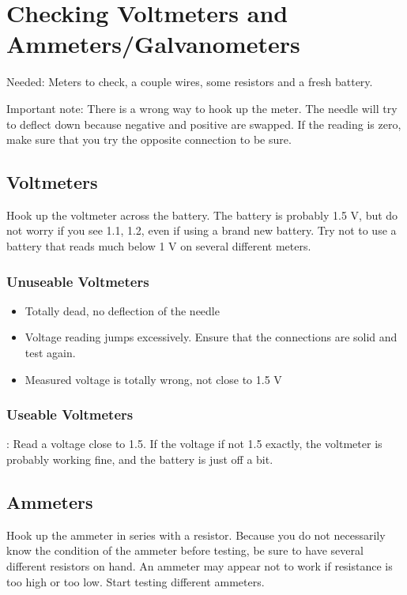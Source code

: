 \chapter{Checking Voltmeters and Ammeters/Galvanometers}
\label{cha:voltamm}
Needed: Meters to check, 
a couple wires, 
some resistors and a fresh battery.

Important note: There is a wrong way to hook up the meter. 
The needle will try to deflect down 
because negative and positive are swapped. 
If the reading is zero, 
make sure that you try the opposite connection to be sure.

\section{Voltmeters}
Hook up the voltmeter across the battery. 
The battery is probably 1.5 V, 
but do not worry if you see 1.1, 
1.2, 
even if using a brand new battery. 
Try not to use a battery that reads much below 1 V 
on several different meters.

\subsection{Unuseable Voltmeters}
\begin{itemize}
\item{Totally dead, no deflection of the needle}
\item{Voltage reading jumps excessively. 
Ensure that the connections are solid and test again.}
\item{Measured voltage is totally wrong, not close to 1.5 V}
\end{itemize}

\subsection{Useable Voltmeters}:
Read a voltage close to 1.5. 
If the voltage if not 1.5 exactly, 
the voltmeter is probably working fine, 
and the battery is just off a bit.

\section{Ammeters}
Hook up the ammeter in series with a resistor. 
Because you do not necessarily know the condition of the ammeter before testing, 
be sure to have several different resistors on hand. 
An ammeter may appear not to work if resistance is too high or too low. 
Start testing different ammeters.

